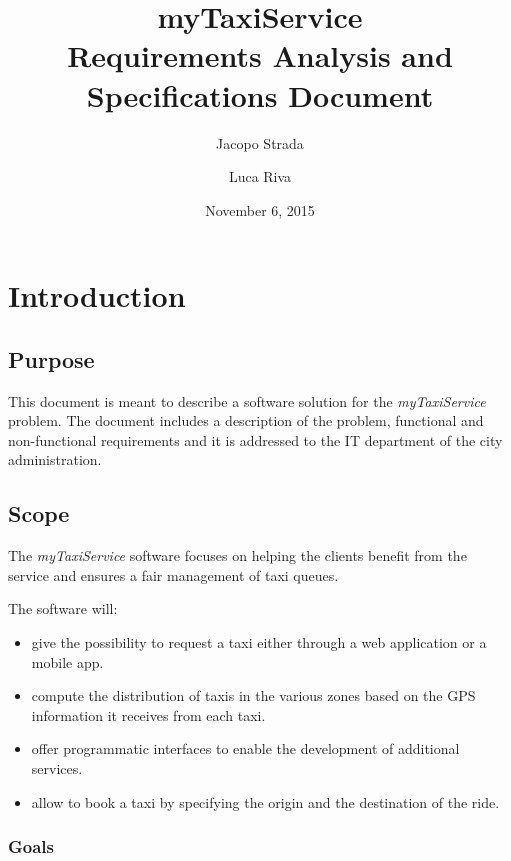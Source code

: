 \documentclass[a4paper]{article}
\title{{\Huge myTaxiService} \\ Requirements Analysis and Specifications Document}
\author{Jacopo Strada \and Luca Riva}
\date{November 6, 2015}
\let\stdsection\section
\renewcommand\section{\newpage\stdsection}
\begin{document}
\maketitle

\newpage

\tableofcontents

\listoffigures 

\listoftables

\setlength{\parindent}{0em}
\setlength{\parskip}{1em}

\section{Introduction}
\subsection{Purpose}
This document is meant to describe a software solution for the \emph{myTaxiService} problem. The document includes a description of the problem, functional and non-functional requirements and it is addressed to the IT department of the city administration.

\subsection{Scope}
The \emph{myTaxiService} software focuses on helping the clients benefit from the service and ensures a fair management of taxi queues.

The software will:

\begin{itemize}
\item give the possibility to request a taxi either through a web application or a mobile app.
\item compute the distribution of taxis in the various zones based on the GPS information it receives from each taxi.
\item offer programmatic interfaces to enable the development of additional services.
\item allow to book a taxi by specifying the origin and the destination of the ride.
\end{itemize}

\subsubsection{Goals}
\end{document}

